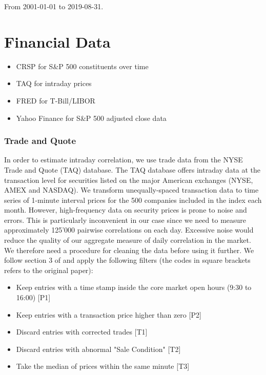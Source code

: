 From 2001-01-01 to 2019-08-31.

\section{Financial Data}
\begin{itemize}
    \item CRSP for S\&P 500 constituents over time
    \item TAQ for intraday prices
    \item FRED for T-Bill/LIBOR
    \item Yahoo Finance for S\&P 500 adjusted close data
\end{itemize}

\subsubsection{Trade and Quote}
In order to estimate intraday correlation, we use trade data from the NYSE Trade and Quote (TAQ) database. The TAQ database offers intraday data at the transaction level for securities listed on the major American exchanges (NYSE, AMEX and NASDAQ). We transform unequally-spaced transaction data to time series of 1-minute interval prices for the 500 companies included in the index each month. However, high-frequency data on security prices is prone to noise and errors. This is particularly inconvenient in our case since we need to measure approximately 125'000 pairwise correlations on each day. Excessive noise would reduce the quality of our aggregate measure of daily correlation in the market. We therefore need a procedure for cleaning the data before using it further. We follow section 3 of \textcite{BarndorffNielsen2009} and apply the following filters (the codes in square brackets refers to the original paper):

\begin{itemize}
    \item Keep entries with a time stamp inside the core market open hours (9:30 to 16:00) [P1]
    \item Keep entries with a transaction price higher than zero [P2]
    \item Discard entries with corrected trades [T1]
    \item Discard entries with abnormal "Sale Condition" [T2]
    \item Take the median of prices within the same minute [T3]
\end{itemize}

